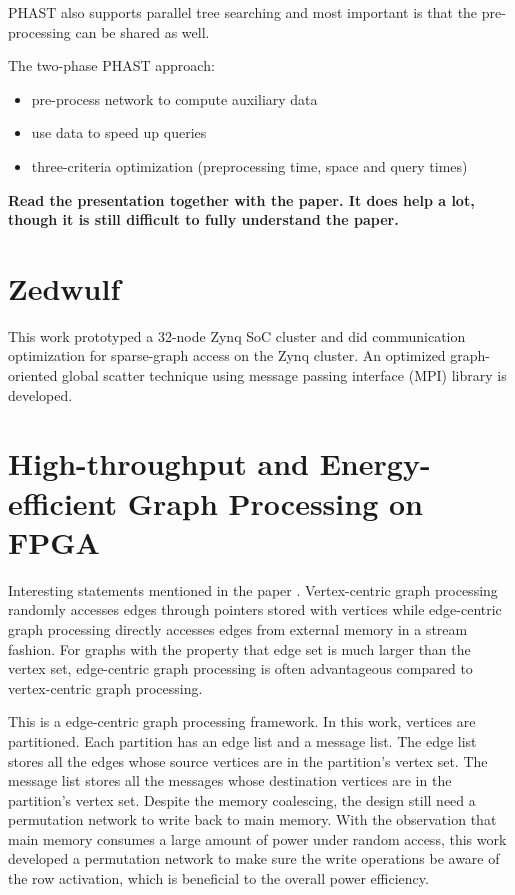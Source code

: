 PHAST also supports parallel tree searching and most important is that the
pre-processing can be shared as well.

The two-phase PHAST approach:
\begin{itemize}
    \item pre-process network to compute auxiliary data
    \item use data to speed up queries
    \item three-criteria optimization (preprocessing time, space and query times)
\end{itemize}

\textbf{Read the presentation together with the paper. It does help a lot,
though it is still difficult to fully understand the paper.}

\section{Zedwulf}
This work \cite{kapre2015case} prototyped a 32-node Zynq SoC cluster and did communication
optimization for sparse-graph access on the Zynq cluster. An optimized
graph-oriented global scatter technique using message passing interface (MPI)
library is developed. 

\section{High-throughput and Energy-efficient Graph Processing on FPGA}
Interesting statements mentioned in the paper \cite{zhou2016high}.
Vertex-centric graph processing randomly accesses edges through pointers stored
with vertices while edge-centric graph processing directly accesses edges from
external memory in a stream fashion. For graphs with the property that edge set
is much larger than the vertex set, edge-centric graph processing is often
advantageous compared to vertex-centric graph processing.

This is a edge-centric graph processing framework. In this work, vertices are
partitioned. Each partition has an edge list and a
message list. The edge list stores all the edges whose source vertices are in
the partition's vertex set. The message list stores all the messages whose
destination vertices are in the partition's vertex set. Despite the memory
coalescing, the design still need a permutation network to write back to main
memory. With the observation that main memory consumes a large amount of power
under random access, this work developed a permutation network to make sure
the write operations be aware of the row activation, which is beneficial to the
overall power efficiency.


